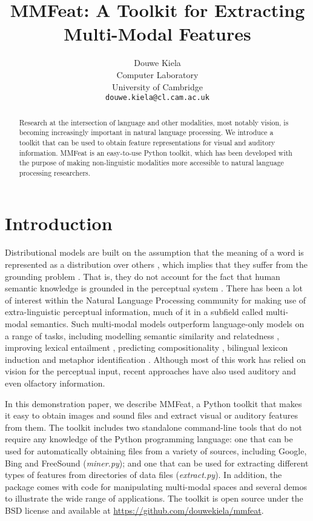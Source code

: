 \documentclass[11pt]{article}
\title{{\sc MMFeat}: A Toolkit for Extracting Multi-Modal Features}
\author{Douwe Kiela\\
	    Computer Laboratory\\
	    University of Cambridge\\
	    {\tt douwe.kiela@cl.cam.ac.uk}
}
\date{}
\begin{document}
\maketitle

\begin{abstract}
Research at the intersection of language and other modalities, most notably vision, is becoming increasingly important in natural language processing. We introduce a toolkit that can be used to obtain feature representations for visual and auditory information. {\sc MMFeat} is an easy-to-use Python toolkit, which has been developed with the purpose of making non-linguistic modalities more accessible to natural language processing researchers.
\end{abstract}

\section{Introduction}

Distributional models are built on the assumption that the meaning of a word is represented as a distribution over others \cite{Turney:2010jair,Clark:2015book}, which implies that they suffer from the grounding problem \cite{Harnad:1990}. That is, they do not account for the fact that human semantic knowledge is grounded in the perceptual system \cite{Louwerse:2011tcs}. There has been a lot of interest within the Natural Language Processing community for making use of extra-linguistic perceptual information, much of it in a subfield called multi-modal semantics. Such multi-modal models outperform language-only models on a range of tasks, including modelling semantic similarity and relatedness \cite{Bruni:2014jair,Silberer:2014acl}, improving lexical entailment \cite{Kiela:2015acl-entailment}, predicting compositionality \cite{Roller:2013emnlp}, bilingual lexicon induction \cite{Bergsma:2011ijcai} and metaphor identification \cite{Shutova:2016naacl}. Although most of this work has relied on vision for the perceptual input, recent approaches have also used auditory \cite{Lopopolo:2015iwcs,Kiela:2015emnlpa} and even olfactory \cite{Kiela:2015acl} information.

In this demonstration paper, we describe {\sc MMFeat}, a Python toolkit that makes it easy to obtain images and sound files and extract visual or auditory features from them. The toolkit includes two standalone command-line tools that do not require any knowledge of the Python programming language: one that can be used for automatically obtaining files from a variety of sources, including Google, Bing and FreeSound (\emph{miner.py}); and one that can be used for extracting different types of features from directories of data files (\emph{extract.py}). In addition, the package comes with code for manipulating multi-modal spaces and several demos to illustrate the wide range of applications. The toolkit is open source under the BSD license and available at \url{https://github.com/douwekiela/mmfeat}.
\end{document}
